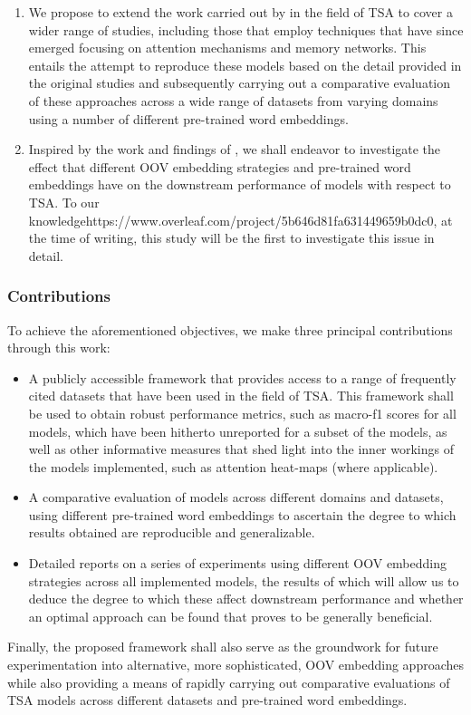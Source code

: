 \documentclass[../../fyp.tex]{subfiles}
\begin{document}
\begin{enumerate}
	\item We propose to extend the work carried out by \citet{moore2018} in the field of TSA to cover a wider range of studies, including those that employ techniques that have since emerged focusing on attention mechanisms and memory networks. This entails the attempt to reproduce these models based on the detail provided in the original studies and subsequently carrying out a comparative evaluation of these approaches across a wide range of datasets from varying domains using a number of different pre-trained word embeddings.
	\item Inspired by the work and findings of \citet{bhuwandhingra2017}, we shall endeavor to investigate the effect that different OOV embedding strategies and pre-trained word embeddings have on the downstream performance of models with respect to TSA. To our knowledgehttps://www.overleaf.com/project/5b646d81fa631449659b0dc0, at the time of writing, this study will be the first to investigate this issue in detail.
\end{enumerate}

\subsubsection{Contributions}

To achieve the aforementioned objectives, we make three principal contributions through this work:
\begin{itemize}
	\item A publicly accessible framework that provides access to a range of frequently cited datasets that have been used in the field of TSA. This framework shall be used to obtain robust performance metrics, such as macro-f1 scores for all models, which have been hitherto unreported for a subset of the models, as well as other informative measures that shed light into the inner workings of the models implemented, such as attention heat-maps (where applicable).
	\item A comparative evaluation of models across different domains and datasets, using different pre-trained word embeddings to ascertain the degree to which results obtained are reproducible and generalizable.
	\item Detailed reports on a series of experiments using different OOV embedding strategies across all implemented models, the results of which will allow us to deduce the degree to which these affect downstream performance and whether an optimal approach can be found that proves to be generally beneficial.
\end{itemize}

Finally, the proposed framework shall also serve as the groundwork for future experimentation into alternative, more sophisticated, OOV embedding approaches while also providing a means of rapidly carrying out comparative evaluations of TSA models across different datasets and pre-trained word embeddings.
\end{document}
